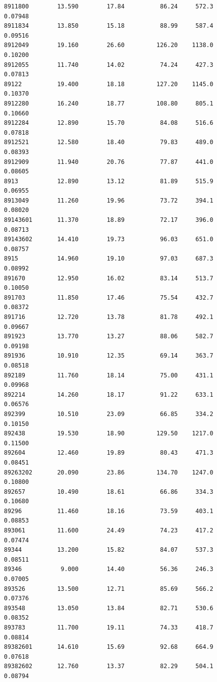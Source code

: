 \documentclass[
  letterpaper,
  DIV=11,
  numbers=noendperiod]{scrartcl}
\begin{document}
\begin{verbatim}
8911800        13.590        17.84          86.24     572.3         0.07948
8911834        13.850        15.18          88.99     587.4         0.09516
8912049        19.160        26.60         126.20    1138.0         0.10200
8912055        11.740        14.02          74.24     427.3         0.07813
89122          19.400        18.18         127.20    1145.0         0.10370
8912280        16.240        18.77         108.80     805.1         0.10660
8912284        12.890        15.70          84.08     516.6         0.07818
8912521        12.580        18.40          79.83     489.0         0.08393
8912909        11.940        20.76          77.87     441.0         0.08605
8913           12.890        13.12          81.89     515.9         0.06955
8913049        11.260        19.96          73.72     394.1         0.08020
89143601       11.370        18.89          72.17     396.0         0.08713
89143602       14.410        19.73          96.03     651.0         0.08757
8915           14.960        19.10          97.03     687.3         0.08992
891670         12.950        16.02          83.14     513.7         0.10050
891703         11.850        17.46          75.54     432.7         0.08372
891716         12.720        13.78          81.78     492.1         0.09667
891923         13.770        13.27          88.06     582.7         0.09198
891936         10.910        12.35          69.14     363.7         0.08518
892189         11.760        18.14          75.00     431.1         0.09968
892214         14.260        18.17          91.22     633.1         0.06576
892399         10.510        23.09          66.85     334.2         0.10150
892438         19.530        18.90         129.50    1217.0         0.11500
892604         12.460        19.89          80.43     471.3         0.08451
89263202       20.090        23.86         134.70    1247.0         0.10800
892657         10.490        18.61          66.86     334.3         0.10680
89296          11.460        18.16          73.59     403.1         0.08853
893061         11.600        24.49          74.23     417.2         0.07474
89344          13.200        15.82          84.07     537.3         0.08511
89346           9.000        14.40          56.36     246.3         0.07005
893526         13.500        12.71          85.69     566.2         0.07376
893548         13.050        13.84          82.71     530.6         0.08352
893783         11.700        19.11          74.33     418.7         0.08814
89382601       14.610        15.69          92.68     664.9         0.07618
89382602       12.760        13.37          82.29     504.1         0.08794

\end{verbatim}
\end{document}
